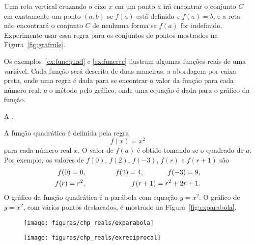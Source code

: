 \documentclass{svmono}
\begin{document}
Uma reta vertical cruzando o eixo $x$ em um ponto $a$ irá encontrar
o conjunto $C$ em exatamente um ponto $(a,b)$ se $f(a)$ está definido
e $f(a) = b$, e a reta não encontrará o conjunto $C$ de nenhuma forma
se $f(a)$ for indefinido. Experimente usar essa regra para os conjuntos
de pontos mostrados na Figura~\ref{fig:grafrule}.


Os exemplos~\ref{ex:funcquad} e \ref{ex:funcrec} ilustram algumas funções
reais de uma variável. Cada função será
descrita de duas maneiras: a abordagem por caixa preta, onde uma regra é
dada para se encontrar o valor da função para cada número real, e o método
pelo gráfico, onde uma equação é dada para o gráfico da função.

\begin{example}\label{ex:funcquad}
A .

A função quadrática é definida pela regra
\[
  f(x) = x^2
\]
para cada número real $x$. O valor de $f(a)$ é obtido tomando-se o
quadrado de $a$. Por exemplo, os valores de $f(0)$, $f(2)$, $f(-3)$,
$f(r)$ e $f(r+1)$ são
\begin{eqnarray*}
   f(0) = 0, && \hspace{0.1\textwidth} f(2) = 4,
  \hspace{0.1\textwidth} f(-3) = 9,  \\
 f(r) = r^2, && \hspace{0.1\textwidth} f(r+1) = r^2 + 2r + 1.
\end{eqnarray*}
O gráfico da função quadrática é a parábola com equação $y = x^2$.
O gráfico de $y = x^2$, com vários pontos destacados, é mostrado
na Figura~\ref{fig:exparabola}.
\end{example}

\begin{figure}
\begin{minipage}[b]{0.45\textwidth}
\texttt{[image: figuras/chp\_reals/exparabola]}
\caption{}
\label{fig:exparabola}
\end{minipage}%
\hfill%
\begin{minipage}[b]{0.5\textwidth}
\texttt{[image: figuras/chp\_reals/exreciprocal]}
\caption{}
\label{fig:exreciprocal}
\end{minipage}%
\end{figure}
\end{document}
